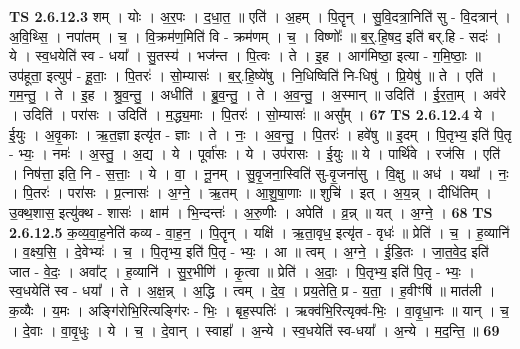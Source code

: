 \documentclass[17pt]{extarticle}
\begin{document}
                  \newline
                                \textbf{ TS 2.6.12.3} \newline
                  शम् । योः । अ॒र॒पः । द॒धा॒त॒ ॥ एति॑ । अ॒हम् । पि॒तॄन् । सु॒वि॒दत्रा॒निति॑ सु - वि॒दत्रान्॑ । अ॒वि॒थ्सि॒ । नपा॑तम् । च॒ । वि॒क्रम॑ण॒मिति॑ वि - क्रम॑णम् । च॒ । विष्णोः᳚ ॥ ब॒र्॒.हि॒षद॒ इति॑ बर्.हि - सदः॑ । ये । स्व॒धयेति॑ स्व - धया᳚ । सु॒तस्य॑ । भज॑न्त । पि॒त्वः । ते । इ॒ह । आग॑मिष्ठा॒ इत्या - ग॒मि॒ष्ठाः॒ ॥ उप॑हूता॒ इत्युप॑ - हू॒ताः॒ । पि॒तरः॑ । सो॒म्यासः॑ । ब॒र्॒.हि॒ष्ये॑षु । नि॒धिष्विति॑ नि-धिषु॑ । प्रि॒येषु॑ ॥ ते । एति॑ । ग॒म॒न्तु॒ । ते । इ॒ह । श्रु॒व॒न्तु॒ । अधीति॑ । ब्रु॒व॒न्तु॒ । ते । अ॒व॒न्तु॒ । अ॒स्मान् ॥ उदिति॑ । ई॒र॒ता॒म् । अव॑रे । उदिति॑ । परा॑सः । उदिति॑ । म॒द्ध्य॒माः । पि॒तरः॑ । सो॒म्यासः॑ ॥ असु᳚म् । \textbf{  67} \newline
                  \newline
                                \textbf{ TS 2.6.12.4} \newline
                  ये । ई॒युः । अ॒वृ॒काः । ऋ॒त॒ज्ञा इत्यृ॑त - ज्ञाः । ते । नः॒ । अ॒व॒न्तु॒ । पि॒तरः॑ । हवे॑षु ॥ इ॒दम् । पि॒तृभ्य॒ इति॑ पि॒तृ - भ्यः॒ । नमः॑ । अ॒स्तु॒ । अ॒द्य । ये । पूर्वा॑सः । ये । उप॑रासः । ई॒युः ॥ ये । पार्थि॑वे । रज॑सि । एति॑ । निष॑त्ता॒ इति॒ नि - स॒त्ताः॒ । ये । वा॒ । नू॒नम् । सु॒वृ॒जना॒स्विति॑ सु-वृ॒जना॑सु । वि॒क्षु ॥ अध॑ । यथा᳚ । नः॒ । पि॒तरः॑ । परा॑सः । प्र॒त्नासः॑ । अ॒ग्ने॒ । ऋ॒तम् । आ॒शु॒षा॒णाः ॥ शुचि॑ । इत् । अ॒य॒न्न् । दीधि॑तिम् । उ॒क्थ॒शास॒ इत्यु॑क्थ - शासः॑ । क्षाम॑ । भि॒न्दन्तः॑ । अ॒रु॒णीः । अपेति॑ । व्र॒न्न् ॥ यत् । अ॒ग्ने॒ । \textbf{  68} \newline
                  \newline
                                \textbf{ TS 2.6.12.5} \newline
                  क॒व्य॒वा॒ह॒नेति॑ कव्य - वा॒ह॒न॒ । पि॒तॄन् । यक्षि॑ । ऋ॒ता॒वृध॒ इत्यृ॑त - वृधः॑ ॥ प्रेति॑ । च॒ । ह॒व्यानि॑ । व॒क्ष्य॒सि॒ । दे॒वेभ्यः॑ । च॒ । पि॒तृभ्य॒ इति॑ पि॒तृ - भ्यः॒ । आ ॥ त्वम् । अ॒ग्ने॒ । ई॒डि॒तः । जा॒त॒वे॒द॒ इति॑ जात - वे॒दः॒ । अवा᳚ट् । ह॒व्यानि॑ । सु॒र॒भीणि॑ । कृ॒त्वा ॥ प्रेति॑ । अ॒दाः॒ । पि॒तृभ्य॒ इति॑ पि॒तृ - भ्यः॒ । स्व॒धयेति॑ स्व - धया᳚ । ते । अ॒क्ष॒न्न् । अ॒द्धि । त्वम् । दे॒व॒ । प्रय॒तेति॒ प्र - य॒ता॒ । ह॒वीꣳषि॑ ॥ मात॑ली । क॒व्यैः । य॒मः । अङ्गि॑रोभि॒रित्यङ्गि॑रः - भिः॒ । बृह॒स्पतिः॑ । ऋक्व॑भि॒रित्यृक्व॑-भिः॒ । वा॒वृ॒धा॒नः ॥ यान् । च॒ । दे॒वाः । वा॒वृ॒धुः । ये । च॒ । दे॒वान् । स्वाहा᳚ । अ॒न्ये । स्व॒धयेति॑ स्व-धया᳚ । अ॒न्ये । म॒द॒न्ति॒ ॥ \textbf{  69} \newline
                  \newline
\end{document}
